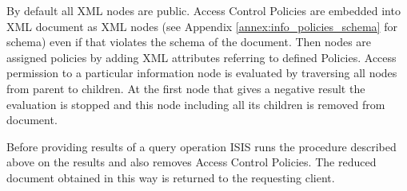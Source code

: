\documentclass{book}
\begin{document}
By default all XML nodes are public. Access Control Policies are embedded into XML document
as XML nodes (see Appendix \ref{annex:info_policies_schema} for schema) even if that violates the schema 
of the document. Then nodes are assigned policies by adding XML attributes referring to defined Policies.
Access permission to a particular information node is evaluated by traversing all nodes from 
parent to children. At the first node that gives a negative result the evaluation is stopped and
this node including all its children is removed from document.

Before providing results of a query operation ISIS runs the procedure described above on the results and 
also removes Access Control Policies. The reduced document obtained in this way is returned to the
requesting client.

%
%
%
%
%
%
%
%
%
\end{document}
